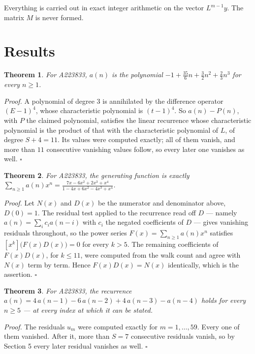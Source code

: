 \documentclass[11pt]{article}
\newtheorem{theorem}{Theorem}
\theoremstyle{definition}
\begin{document}
Everything is carried out in exact integer arithmetic on the vector $L^{m-1}y$. The matrix $M$ is never formed.

\section{Results}

\begin{theorem} For A223833, $a(n)$ is the polynomial $-1 + \frac{35}{6}n + \frac{3}{2}n^{2} + \frac{2}{3}n^{3}$ for every $n \ge 1$.\end{theorem}

{\itshape Proof.} A polynomial of degree $3$ is annihilated by the difference operator $(E-1)^{4}$, whose characteristic polynomial is $(t-1)^{4}$. So $a(n) - P(n)$, with $P$ the claimed polynomial, satisfies the linear recurrence whose characteristic polynomial is the product of that with the characteristic polynomial of $L$, of degree $S + 4 = 11$. Its values were computed exactly; all of them vanish, and more than $11$ consecutive vanishing values follow, so every later one vanishes as well. $\square$

\begin{theorem} For A223833, the generating function is exactly $\sum_{n\ge 1} a(n)x^n = \frac{7x - 6x^{2} + 2x^{3} + x^{4}}{1 - 4x + 6x^{2} - 4x^{3} + x^{4}}$.\end{theorem}

{\itshape Proof.} Let $N(x)$ and $D(x)$ be the numerator and denominator above, $D(0)=1$. The residual test applied to the recurrence read off $D$ --- namely $a(n) = \sum_i c_i a(n-i)$ with $c_i$ the negated coefficients of $D$ --- gives vanishing residuals throughout, so the power series $F(x)=\sum_{n\ge 1}a(n)x^n$ satisfies $[x^k]\bigl(F(x)D(x)\bigr) = 0$ for every $k > 5$. The remaining coefficients of $F(x)D(x)$, for $k \le 11$, were computed from the walk count and agree with $N(x)$ term by term. Hence $F(x)D(x) = N(x)$ identically, which is the assertion. $\square$

\begin{theorem} For A223833, the recurrence $a(n) = 4\,a(n-1) - 6\,a(n-2) + 4\,a(n-3) - a(n-4)$ holds for every $n \ge 5$ --- at every index at which it can be stated.\end{theorem}

{\itshape Proof.} The residuals $u_m$ were computed exactly for $m = 1,\dots,59$. Every one of them vanished. After it, more than $S = 7$ consecutive residuals vanish, so by Section 5 every later residual vanishes as well. $\square$
\end{document}
